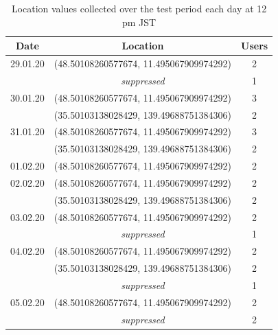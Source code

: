 \begin{table}[htbp]
	\centering
	\begin{tabular}{|c c c|} 
		\hline
		Date & Location & Users\\ [0.5ex] 
		\hline\hline
		29.01.20 & (48.50108260577674, 11.495067909974292) & 2 \\
		&\textit{suppressed}& 1 \\
		\hline
		30.01.20 & (48.50108260577674, 11.495067909974292) & 3 \\ 
		& (35.50103138028429, 139.49688751384306) & 2 \\
		\hline
		31.01.20 & (48.50108260577674, 11.495067909974292) & 3 \\ 
		& (35.50103138028429, 139.49688751384306) & 2 \\
		\hline
		01.02.20 & (48.50108260577674, 11.495067909974292) & 2 \\ 
		\hline
		02.02.20 & (48.50108260577674, 11.495067909974292) & 2 \\ 
		& (35.50103138028429, 139.49688751384306) & 2 \\
		\hline
		03.02.20 & (48.50108260577674, 11.495067909974292) & 2 \\ 
		&\textit{suppressed}& 1 \\
		\hline
		04.02.20 & (48.50108260577674, 11.495067909974292) & 2 \\ 
		& (35.50103138028429, 139.49688751384306) & 2 \\
		&\textit{suppressed}& 1 \\
		\hline
		05.02.20 & (48.50108260577674, 11.495067909974292) & 2 \\
		&\textit{suppressed}& 2 \\
		\hline
	\end{tabular}
	\caption{Location values collected over the test period each day at 12 pm JST}
	\label{tab:location_jst}
\end{table}

